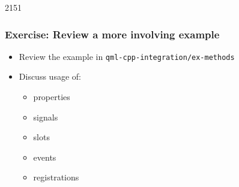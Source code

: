 \begin{slide}{2151}\frametitle{Exercise: Review a more involving example}
  \begin{itemize}
  \item Review the example in \texttt{qml-cpp-integration/ex-methods}
  \item Discuss usage of:
    \begin{itemize}
    \item properties
    \item signals
    \item slots
    \item events
    \item registrations
    \end{itemize}
  \end{itemize}
\end{slide}

